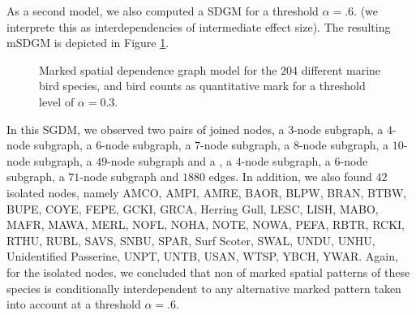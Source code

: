 \documentclass{statsoc}
\begin{document}
  

As a second model, we also computed a SDGM for a threshold $\alpha=.6$. (we interprete this as interdependencies of intermediate effect size). The resulting mSDGM is depicted in Figure \ref{fig:g60}.

\begin{figure}
\centering
{}
      \caption{\label{fig:g60} Marked spatial dependence graph model for the $204$ different marine bird species, and bird counts as quantitative mark for a threshold level of $\alpha=0.3$.}
\end{figure} 

In this SGDM, we observed two pairs of joined nodes, a $3$-node subgraph, a $4$-node subgraph, a $6$-node subgraph, a $7$-node subgraph, a $8$-node subgraph, a $10$-node subgraph, a $49$-node subgraph and a , a $4$-node subgraph, a $6$-node subgraph, a $71$-node subgraph and $1880$ edges. In addition, we also found $42$ isolated nodes, namely AMCO, AMPI, AMRE, BAOR, BLPW, BRAN, BTBW, BUPE, COYE, FEPE, GCKI, GRCA, Herring Gull, LESC, LISH, MABO, MAFR, MAWA, MERL, NOFL, NOHA, NOTE, NOWA, PEFA, RBTR, RCKI, RTHU, RUBL, SAVS, SNBU, SPAR, Surf Scoter, SWAL, UNDU, UNHU, Unidentified Passerine, UNPT, UNTB, USAN, WTSP, YBCH, YWAR. Again, for the isolated nodes, we concluded that non of marked spatial patterns of these species is conditionally interdependent to any alternative marked pattern taken into account at a threshold $\alpha=.6$.  
\end{document}
